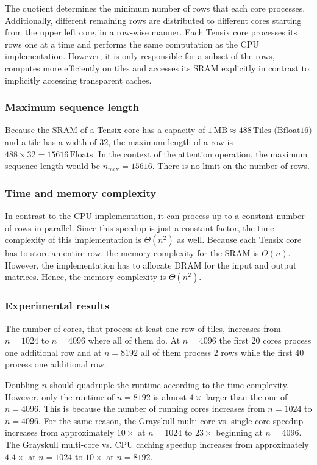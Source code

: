 \documentclass[conference]{IEEEtran}
\begin{document}
The quotient determines the minimum number of rows that each core processes. Additionally, different remaining rows are distributed to different cores starting from the upper left core, in a row-wise manner. Each Tensix core processes its rows one at a time and performs the same computation as the CPU implementation. However, it is only responsible for a subset of the rows, computes more efficiently on tiles and accesses its SRAM explicitly in contrast to implicitly accessing transparent caches.

\subsubsection{\textbf{Maximum sequence length}}
Because the SRAM of a Tensix core has a capacity of \(1\,\text{MB} \approx 488\,\text{Tiles (Bfloat16)}\) and a tile has a width of \(32\), the maximum length of a row is \(488 \times 32 = 15616\,\text{Floats}\). In the context of the attention operation, the maximum sequence length would be \(n_{\text{max}} = 15616\). There is no limit on the number of rows.

\subsubsection{\textbf{Time and memory complexity}}
In contrast to the CPU implementation, it can process up to a constant number of rows in parallel. Since this speedup is just a constant factor, the time complexity of this implementation is \(\Theta(n^2)\) as well. Because each Tensix core has to store an entire row, the memory complexity for the SRAM is \(\Theta(n)\). However, the implementation has to allocate DRAM for the input and output matrices. Hence, the memory complexity is \(\Theta(n^2)\).

\subsubsection{\textbf{Experimental results}}
The number of cores, that process at least one row of tiles, increases from \(n = 1024\) to \(n = 4096\) where all of them do. At \(n = 4096\) the first \(20\) cores process one additional row and at \(n = 8192\) all of them process \(2\) rows while the first \(40\) process one additional row. 

Doubling \(n\) should quadruple the runtime according to the time complexity. However, only the runtime of \(n=8192\) is almost \(4\times\) larger than the one of \(n=4096\). This is because the number of running cores increases from \(n = 1024\) to \(n = 4096\). For the same reason, the Grayskull multi-core vs. single-core speedup increases from approximately \(10\times\) at \(n = 1024\) to \(23\times\) beginning at \(n = 4096\). The Grayskull multi-core vs. CPU caching speedup increases from approximately \(4.4\times\) at \(n = 1024\) to \(10\times\) at \(n = 8192\).
\end{document}
